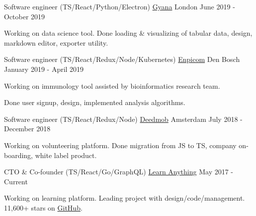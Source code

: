 
\begin{cventries}

  \cventry
    {Software engineer (TS/React/Python/Electron)}
    {\href{https://www.gyana.co.uk}{Gyana}}
    {London}
    {June 2019 - October 2019}
     {
      \begin{cvitems}
        \item {Working on data science tool. Done loading \& visualizing of tabular data, design, markdown editor, exporter utility.}
      \end{cvitems}
    }

  \cventry
    {Software engineer (TS/React/Redux/Node/Kubernetes)}
    {\href{https://www.enpicom.com}{Enpicom}}
    {Den Bosch}
    {January 2019 - April 2019}
     {
      \begin{cvitems}
        \item {Working on immunology tool assisted by bioinformatics research team.}
        \item {Done user signup, design, implemented analysis algorithms.}
      \end{cvitems}
    }

  \cventry
    {Software engineer (TS/React/Redux/Node)}
    {\href{https://www.deedmob.com}{Deedmob}}
    {Amsterdam}
    {July 2018 - December 2018}
     {
      \begin{cvitems}
        \item {Working on volunteering platform. Done migration from JS to TS, company on-boarding, white label product.}
      \end{cvitems}
    }

  \cventry
    {CTO \& Co-founder (TS/React/Go/GraphQL)}
    {\href{https://learn-anything.xyz}{Learn Anything}}
    {}
    {May 2017 - Current}
     {
      \begin{cvitems}
        \item {Working on learning platform. Leading project with design/code/management. 11,600+ stars on \href{https://github.com/learn-anything/learn-anything}{GitHub}.}
      \end{cvitems}
    }

\end{cventries}
